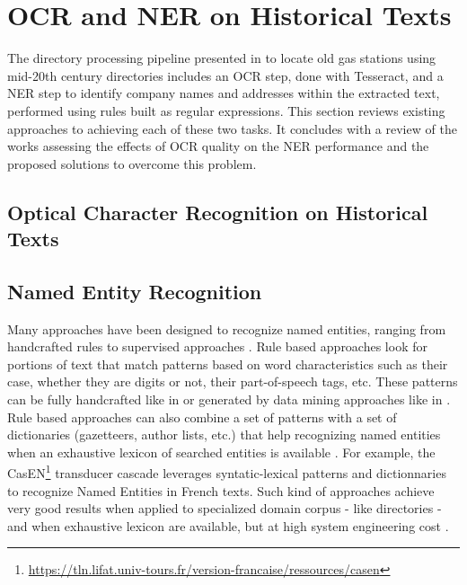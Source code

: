 \section{OCR and NER on Historical Texts}

The directory processing pipeline presented in \cite{bell2020automated} to locate old gas stations using mid-20th century directories includes an OCR step, done with Tesseract, and a NER step to identify company names and addresses within the extracted text, performed using rules built as regular expressions. This section reviews existing approaches to achieving each of these two tasks. It concludes with a review of the works assessing the effects of OCR quality on the NER performance and the proposed solutions to overcome this problem. 

\subsection{Optical Character Recognition on Historical Texts}

\subsection{Named Entity Recognition}

Many approaches have been designed to recognize named entities, ranging from handcrafted rules to supervised approaches \cite{nadeau2007}. Rule based approaches look for portions of text that match patterns based on word characteristics such as their case, whether they are digits or not, their part-of-speech tags, etc. These patterns can be fully handcrafted like in \cite{bell2020automated} or generated by data mining approaches like in \cite{nouvel2011}. Rule based approaches can also combine a set of patterns with a set of dictionaries (gazetteers, author lists, etc.) that help recognizing named entities when an exhaustive lexicon of searched entities is available \cite{mansouri2008,maurel2011}. For example, the CasEN\footnote{\url{https://tln.lifat.univ-tours.fr/version-francaise/ressources/casen}} transducer cascade leverages syntatic-lexical patterns and dictionnaries to recognize Named Entities in French texts. Such kind of approaches achieve very good results when applied to specialized domain corpus - like directories - and when exhaustive lexicon are available, but at high system engineering cost \cite{nadeau2007}. 


